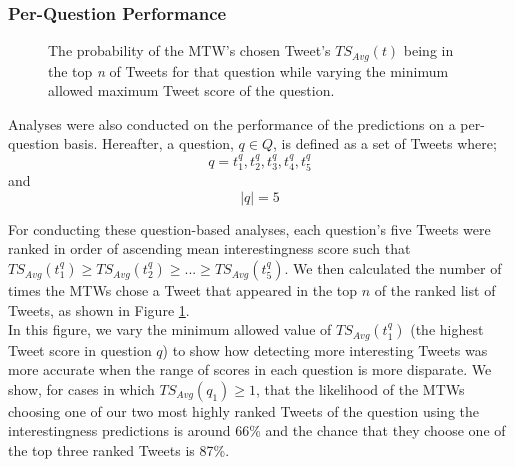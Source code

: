 \begin{enumerate}
\subsubsection{Per-Question Performance}
\begin{figure}[h]
\caption{The probability of the MTW's chosen Tweet's $TS_{Avg}(t)$ being in the top \textit{n} of Tweets for that question while varying the minimum allowed maximum Tweet score of the question.}
\label{fig:score-dist}
\end{figure}
Analyses were also conducted on the performance of the predictions on a per-question basis. Hereafter, a question, $q \in Q$, is defined as a set of Tweets where;
\[ q = {t^q_1, t^q_2, t^q_3, t^q_4, t^q_5} \]
and
\[ |q| = 5 \]

For conducting these question-based analyses, each question's five Tweets were ranked in order of ascending mean interestingness score such that $TS_{Avg}(t^q_1) \geq TS_{Avg}(t^q_2) \geq ... \geq TS_{Avg}(t^q_5)$. We then calculated the number of times the MTWs chose a Tweet that appeared in the top $n$ of the ranked list of Tweets, as shown in Figure \ref{fig:score-dist}.\\
In this figure, we vary the minimum allowed value of $TS_{Avg}(t^q_1)$ (the highest Tweet score in question $q$) to show how detecting more interesting Tweets was more accurate when the range of scores in each question is more disparate. We show, for cases in which $TS_{Avg}(q_1) \geq 1$, that the likelihood of the MTWs choosing one of our two most highly ranked Tweets of the question using the interestingness predictions is around 66\% and the chance that they choose one of the top three ranked Tweets is 87\%.


\end{enumerate}
